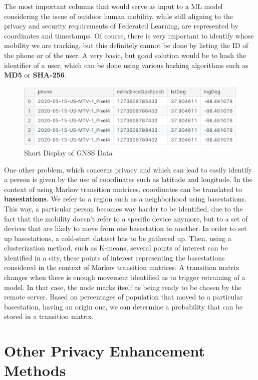 \documentclass[conference]{IEEEtran}
\begin{document}
The most important columns that would serve as input to a ML model considering the issue of outdoor human mobility, while still aligning to the privacy and security requirements of Federated Learning, are represented by coordinates and timestamps. Of course, there is very important to identify whose mobility we are tracking, but this definitely cannot be done by listing the ID of the phone or of the user. A very basic, but good solution would be to hash the identifier of a user, which can be done using various hashing algorithms such as \textbf{MD5} or \textbf{SHA-256}.

\begin{figure}[htbp]
\centerline{\includegraphics[scale=0.5]{pixel_data.png}}
\caption{Short Display of GNSS Data}
\label{fig}
\end{figure}

One other problem, which concerns privacy and which can lead to easily identify a person is given by the use of coordinates such as latitude and longitude. In the context of using Markov transition matrices, coordinates can be translated to \textbf{basestations}. We refer to a region such as a neighborhood using basestations. This way, a particular person becomes way harder to be identified, due to the fact that the mobility doesn't refer to a specific device anymore, but to a set of devices that are likely to move from one basestation to another.
In order to set up basestations, a cold-start dataset has to be gathered up. Then, using a clusterization method, such as K-means, several points of interest can be identified in a city, these points of interest representing the basestations considered in the context of Markov transition matrices.
A transition matrix changes when there is enough movement identified as to trigger retraining of a model. In that case, the node marks itself as being ready to be chosen by the remote server. Based on percentages of population that moved to a particular basestation, having an origin one, we can determine a probability that can be stored in a transition matrix.

\section{Other Privacy Enhancement Methods}
\end{document}
